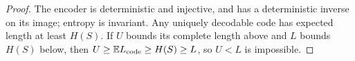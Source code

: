 \begin{proof}
The encoder is deterministic and injective, and has a deterministic
inverse on its image; entropy is invariant. Any uniquely decodable
code has expected length at least $H(S)$. If $U$ bounds its complete
length above and $L$ bounds $H(S)$ below, then
$U\ge\mathbb E L_{\rm code}\ge H(S)\ge L$, so $U<L$ is impossible.
\end{proof}
